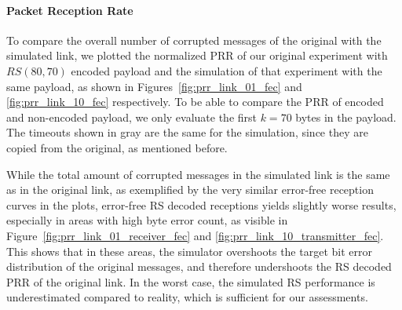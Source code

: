 \paragraph{Packet Reception Rate}

To compare the overall number of corrupted messages of the original with the simulated link, we plotted the normalized \ac{PRR} of our original experiment with $RS(80,70)$ encoded payload and the simulation of that experiment with the same payload, as shown in Figures~\ref{fig:prr_link_01_fec} and \ref{fig:prr_link_10_fec} respectively.
To be able to compare the \ac{PRR} of encoded and non-encoded payload, we only evaluate the first $k=70$ bytes in the payload.
The timeouts shown in gray are the same for the simulation, since they are copied from the original, as mentioned before.

While the total amount of corrupted messages in the simulated link is the same as in the original link, as exemplified by the very similar error-free reception curves in the plots, error-free \ac{RS} decoded receptions yields slightly worse results, especially in areas with high byte error count, as visible in Figure~\ref{fig:prr_link_01_receiver_fec} and \ref{fig:prr_link_10_transmitter_fec}.
This shows that in these areas, the simulator overshoots the target bit error distribution of the original messages, and therefore undershoots the \ac{RS} decoded \ac{PRR} of the original link.
In the worst case, the simulated \ac{RS} performance is underestimated compared to reality, which is sufficient for our assessments.

